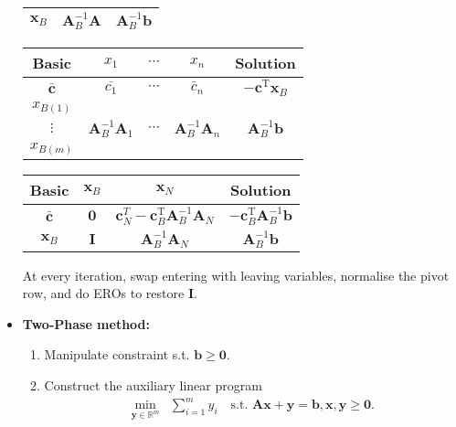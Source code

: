 \documentclass[10pt]{article}
\newcommand{\R}{\mathbb{R}}
\begin{document}
\begin{multicols*}{3}
\begin{itemize}
\begin{center}
\begin{tabular}{|c|c|c|}
                    \hline
                    $\bm{x}_B$ & $\bm{A}_B^{-1}\bm{A}$ & $\bm{A}_B^{-1}\bm{b}$ \\
                    \hline
                \end{tabular}
                \begin{tabular}{|c|ccc|c|}
                    \hline
                    Basic & $x_1$ & $\cdots$ & $x_n$ & Solution \\
                    \hline
                    $\bm{\bar{c}}$ & $\bar{c_1}$ & $\cdots$ & $\bar{c}_n$ & $-\bm{c}^{\mathrm{T}}\bm{x}_B$ \\
                    \hline
                    $x_{B(1)}$ & & & & \\
                    $\vdots$ & $\bm{A}_B^{-1}\bm{A}_1$ & $\cdots$ & $\bm{A}_B^{-1}\bm{A}_n$ & $\bm{A}_B^{-1}\bm{b}$ \\
                    $x_{B(m)}$ & & & & \\
                    \hline
                \end{tabular}
                \begin{tabular}{|c|cc|c|}
                    \hline
                    Basic & $\bm{x}_B$ & $\bm{x}_N$ & Solution \\
                    \hline
                    $\bm{\bar{c}}$ & $\mathbf{0}$ & $\bm{c}_N^{T} - \bm{c}_B^{\mathrm{T}}\bm{A}_B^{-1}\bm{A}_N$ & $-\bm{c}_B^{\mathrm{T}}\bm{A}_B^{-1}\bm{b}$ \\
                    \hline
                    $\bm{x}_B$ & $\bm{I}$ & $\bm{A}_B^{-1}\bm{A}_N$ & $\bm{A}_B^{-1}\bm{b}$ \\
                    \hline
                \end{tabular}
            \end{center}
            At every iteration, swap entering with leaving variables, normalise the pivot row, and do EROs to restore $\bm{I}$.
            \item \textbf{Two-Phase method:} 
            \begin{enumerate}
                \item Manipulate constraint s.t. $\bm{b} \geq \mathbf{0}$.
                \item Construct the auxiliary linear program
                \begin{align*}
                    \min_{\bm{y} \in \R^m} & \sum_{i = 1}^{m}y_i \quad\textrm{s.t. } \bm{Ax + y = b}, \bm{x}, \bm{y} \geq \mathbf{0}.
                \end{align*}

\end{enumerate}
\end{itemize}
\end{multicols*}
\end{document}
